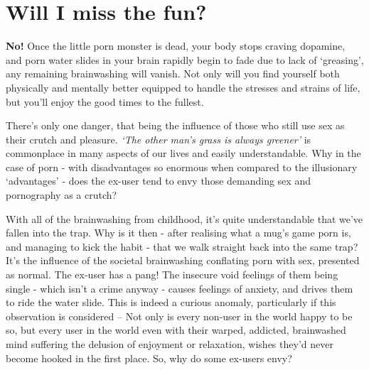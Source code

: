 \documentclass[
]{book}
\begin{document}
\hypertarget{will-i-miss-the-fun}{%
\chapter{Will I miss the fun?}\label{will-i-miss-the-fun}}

\textbf{No!} Once the little porn monster is dead, your body stops craving dopamine, and porn water slides in your brain rapidly begin to fade due to lack of `greasing', any remaining brainwashing will vanish. Not only will you find yourself both physically and mentally better equipped to handle the stresses and strains of life, but you'll enjoy the good times to the fullest.

There's only one danger, that being the influence of those who still use sex as their crutch and pleasure. \emph{`The other man's grass is always greener'} is commonplace in many aspects of our lives and easily understandable. Why in the case of porn - with disadvantages so enormous when compared to the illusionary `advantages' - does the ex-user tend to envy those demanding sex and pornography as a crutch?

With all of the brainwashing from childhood, it's quite understandable that we've fallen into the trap. Why is it then - after realising what a mug's game porn is, and managing to kick the habit - that we walk straight back into the same trap? It's the influence of the societal brainwashing conflating porn with sex, presented as normal. The ex-user has a pang! The insecure void feelings of them being single - which isn't a crime anyway - causes feelings of anxiety, and drives them to ride the water slide. This is indeed a curious anomaly, particularly if this observation is considered -- Not only is every non-user in the world happy to be so, but every user in the world even with their warped, addicted, brainwashed mind suffering the delusion of enjoyment or relaxation, wishes they'd never become hooked in the first place. So, why do some ex-users envy?
\end{document}
